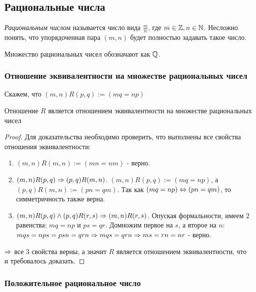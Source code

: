 \subsection{Рациональные числа}

\begin{definition}
    \textit{Рациональным числом} называется число вида $\frac{m}{n}$, где $m \in \mathbb{Z}, n \in \mathbb{N}$. Несложно понять, что упорядоченная пара $(m, n)$ будет полностью задавать такое число.
    
    Множество рациональных чисел обозначают как $\mathbb{Q}$.
\end{definition}

\subsubsection{Отношение эквивалентности на множестве рациональных чисел}

\begin{definition}
    Скажем, что $(m, n)R(p, q) := (mq = np)$
\end{definition}

\begin{proposition}
    Отношение $R$ является отношением эквивалентности на множестве рациональных чисел
\end{proposition}

\begin{proof}
    Для доказательства необходимо проверить, что выполнены все свойства отношения эквивалентности:
    \begin{enumerate}
        \item $(m, n)R(m, n) := (mn = nm)$ - верно.
        \item $(m, n)R(p, q) \Rightarrow (p, q)R(m, n)$. $(m, n)R(p, q) := (mq = np)$, а $(p, q)R(m, n) := (pn = qm)$. Так как $(mq = np) \Leftrightarrow (pn = qm)$, то симметричность также верна.
        \item $(m, n)R(p, q) \wedge (p, q)R(r, s) \Rightarrow (m, n)R(r, s)$. Опуская формальности, имеем $2$ равенства: $mq = np$ и $ps = qr$. Домножим первое на $s$, а второе на $n$: $mqs = nps = psn = qrn \Rightarrow mqs = qrn \Rightarrow ms = rn = nr$ - верно.
    \end{enumerate}
    $\Rightarrow$ все $3$ свойства верны, а значит $R$ является отношением эквивалентности, что и требовалось доказать.
\end{proof}

\subsubsection{Положительное рациональное число}

